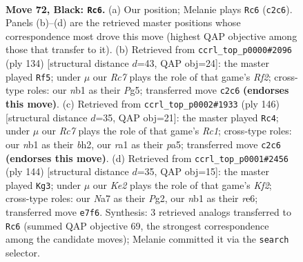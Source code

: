 \documentclass[11pt]{article}
\begin{document}
\clearpage

\begin{figure}[p]\centering
\begin{subfigure}{0.46\textwidth}\centering
\resizebox{\linewidth}{!}{%
\newchessgame
\chessboard[
  setfen={6K1/n1P1k3/p7/P4p1p/4pBb1/6P1/2r5/RN6 b - - 51 72},
  showmover=false,
  pgfstyle=straightmove, color=movearrow, markmove={c2-c6}
]}
\caption{}
\end{subfigure}\hfill
\begin{subfigure}{0.46\textwidth}\centering
\resizebox{\linewidth}{!}{%
\newchessgame
\chessboard[
  setfen={8/5pk1/1pr5/p5P1/Pb1p2K1/3B4/2P2R2/8 w - - 8 68},
  showmover=false,
  pgfstyle=straightmove, color=movearrow, markmove={f2-f5}
]}
\caption{}
\end{subfigure}
\\[4pt]
\begin{subfigure}{0.46\textwidth}\centering
\resizebox{\linewidth}{!}{%
\newchessgame
\chessboard[
  setfen={8/2p3r1/1p2k3/pP6/P2pB3/3P4/4PK1b/2R5 w - - 19 74},
  showmover=false,
  pgfstyle=straightmove, color=movearrow, markmove={c1-c4}
]}
\caption{}
\end{subfigure}\hfill
\begin{subfigure}{0.46\textwidth}\centering
\resizebox{\linewidth}{!}{%
\newchessgame
\chessboard[
  setfen={8/R7/4r1p1/3k3p/p7/B6P/1Pb2KP1/8 w - - 8 73},
  showmover=false,
  pgfstyle=straightmove, color=movearrow, markmove={f2-g3}
]}
\caption{}
\end{subfigure}
\caption{\textbf{Move 72, Black: \texttt{Rc6}.} (a) Our position; Melanie plays \texttt{Rc6} (\texttt{c2c6}). Panels (b)--(d) are the retrieved master positions whose correspondence most drove this move (highest QAP objective among those that transfer to it). (b) Retrieved from \texttt{ccrl\_top\_p0000\#2096} (ply 134) [structural distance $d$=43, QAP obj=24]: the master played \texttt{Rf5}; under $\mu$ our \emph{Rc7} plays the role of that game's \emph{Rf2}; cross-type roles: our \emph{n}b1 as their \emph{P}g5; transferred move \texttt{c2c6} \textbf{(endorses this move)}. (c) Retrieved from \texttt{ccrl\_top\_p0002\#1933} (ply 146) [structural distance $d$=35, QAP obj=21]: the master played \texttt{Rc4}; under $\mu$ our \emph{Rc7} plays the role of that game's \emph{Rc1}; cross-type roles: our \emph{n}b1 as their \emph{b}h2, our \emph{r}a1 as their \emph{p}a5; transferred move \texttt{c2c6} \textbf{(endorses this move)}. (d) Retrieved from \texttt{ccrl\_top\_p0001\#2456} (ply 144) [structural distance $d$=35, QAP obj=15]: the master played \texttt{Kg3}; under $\mu$ our \emph{Ke2} plays the role of that game's \emph{Kf2}; cross-type roles: our \emph{N}a7 as their \emph{P}g2, our \emph{n}b1 as their \emph{r}e6; transferred move \texttt{e7f6}. Synthesis: 3 retrieved analogs transferred to \texttt{Rc6} (summed QAP objective 69, the strongest correspondence among the candidate moves); Melanie committed it via the \texttt{search} selector.}
\label{fig:thought-m143}
\end{figure}
\end{document}
